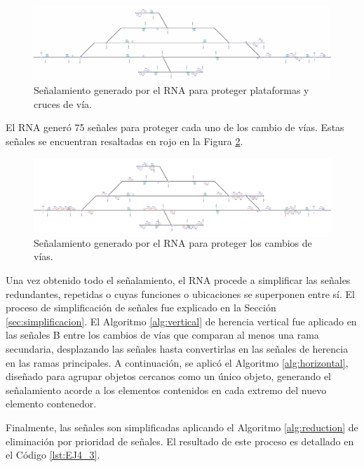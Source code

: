 \begin{figure}[H]
	\centering
	\includegraphics[width=1\textwidth]{resultados-obtenidos/ejemplo4/images/4_step3.png}
	\centering\caption{Señalamiento generado por el RNA para proteger plataformas y cruces de vía.}
	\label{fig:EJ4_5}
\end{figure}

El RNA generó 75 señales para proteger cada uno de los cambio de vías. Estas señales se encuentran resaltadas en rojo en la Figura \ref{fig:EJ4_6}.

\begin{figure}[H]
	\centering
	\includegraphics[width=1\textwidth]{resultados-obtenidos/ejemplo4/images/4_step4.png}
	\centering\caption{Señalamiento generado por el RNA para proteger los cambios de vías.}
	\label{fig:EJ4_6}
\end{figure}

Una vez obtenido todo el señalamiento, el RNA procede a simplificar las señales redundantes, repetidas o cuyas funciones o ubicaciones se superponen entre sí. El proceso de simplificación de señales fue explicado en la Sección \ref{sec:simplificacion}. El Algoritmo \ref{alg:vertical} de herencia vertical fue aplicado en las señales B entre los cambios de vías que comparan al menos una rama secundaria, desplazando las señales hasta convertirlas en las señales de herencia en las ramas principales. A continuación, se aplicó el Algoritmo \ref{alg:horizontal}, diseñado para agrupar objetos cercanos como un único objeto, generando el señalamiento acorde a los elementos contenidos en cada extremo del nuevo elemento contenedor.

Finalmente, las señales son simplificadas aplicando el Algoritmo \ref{alg:reduction} de eliminación por prioridad de señales. El resultado de este proceso es detallado en el Código \ref{lst:EJ4_3}.

